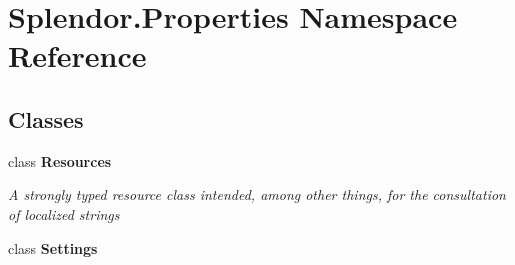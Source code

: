 \hypertarget{namespace_splendor_1_1_properties}{}\section{Splendor.\+Properties Namespace Reference}
\label{namespace_splendor_1_1_properties}
\subsection*{Classes}
\begin{DoxyCompactItemize}
\item 
class {\bfseries Resources}
\begin{DoxyCompactList}\small\item\em A strongly typed resource class intended, among other things, for the consultation of localized strings \end{DoxyCompactList}\item 
class {\bfseries Settings}
\end{DoxyCompactItemize}
